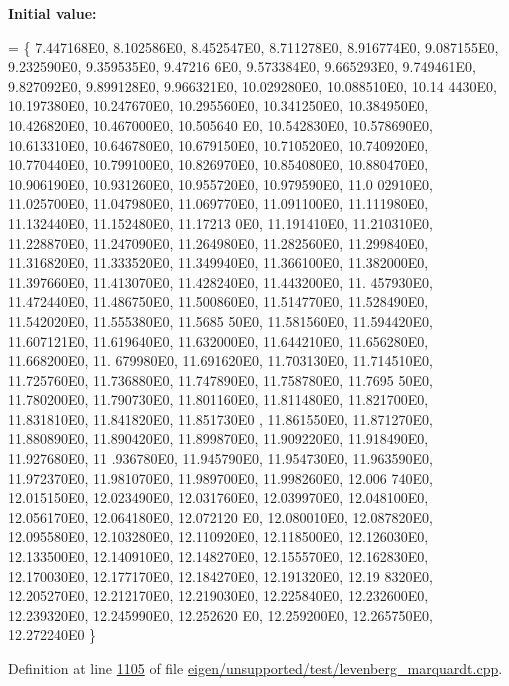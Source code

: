 {\bfseries Initial value\+:}
\begin{DoxyCode}
= \{ 7.447168E0, 8.102586E0, 8.452547E0, 8.711278E0, 8.916774E0, 9.087155E0, 9.232590E0, 9.359535E0, 9.47216
      6E0, 9.573384E0, 9.665293E0, 9.749461E0, 9.827092E0, 9.899128E0, 9.966321E0, 10.029280E0, 10.088510E0, 10.14
      4430E0, 10.197380E0, 10.247670E0, 10.295560E0, 10.341250E0, 10.384950E0, 10.426820E0, 10.467000E0, 10.505640
      E0, 10.542830E0, 10.578690E0, 10.613310E0, 10.646780E0, 10.679150E0, 10.710520E0, 10.740920E0, 10.770440E0, 
      10.799100E0, 10.826970E0, 10.854080E0, 10.880470E0, 10.906190E0, 10.931260E0, 10.955720E0, 10.979590E0, 11.0
      02910E0, 11.025700E0, 11.047980E0, 11.069770E0, 11.091100E0, 11.111980E0, 11.132440E0, 11.152480E0, 11.17213
      0E0, 11.191410E0, 11.210310E0, 11.228870E0, 11.247090E0, 11.264980E0, 11.282560E0, 11.299840E0, 11.316820E0,
       11.333520E0, 11.349940E0, 11.366100E0, 11.382000E0, 11.397660E0, 11.413070E0, 11.428240E0, 11.443200E0, 11.
      457930E0, 11.472440E0, 11.486750E0, 11.500860E0, 11.514770E0, 11.528490E0, 11.542020E0, 11.555380E0, 11.5685
      50E0,
11.581560E0, 11.594420E0, 11.607121E0, 11.619640E0, 11.632000E0, 11.644210E0, 11.656280E0, 11.668200E0, 11.
      679980E0, 11.691620E0, 11.703130E0, 11.714510E0, 11.725760E0, 11.736880E0, 11.747890E0, 11.758780E0, 11.7695
      50E0, 11.780200E0, 11.790730E0, 11.801160E0, 11.811480E0, 11.821700E0, 11.831810E0, 11.841820E0, 11.851730E0
      , 11.861550E0, 11.871270E0, 11.880890E0, 11.890420E0, 11.899870E0, 11.909220E0, 11.918490E0, 11.927680E0, 11
      .936780E0, 11.945790E0, 11.954730E0, 11.963590E0, 11.972370E0, 11.981070E0, 11.989700E0, 11.998260E0, 12.006
      740E0, 12.015150E0, 12.023490E0, 12.031760E0, 12.039970E0, 12.048100E0, 12.056170E0, 12.064180E0, 12.072120
      E0, 12.080010E0, 12.087820E0, 12.095580E0, 12.103280E0, 12.110920E0, 12.118500E0, 12.126030E0, 12.133500E0, 
      12.140910E0, 12.148270E0, 12.155570E0, 12.162830E0, 12.170030E0, 12.177170E0, 12.184270E0, 12.191320E0, 12.19
      8320E0, 12.205270E0, 12.212170E0, 12.219030E0, 12.225840E0, 12.232600E0, 12.239320E0, 12.245990E0, 12.252620
      E0, 12.259200E0, 12.265750E0, 12.272240E0 \}
\end{DoxyCode}


Definition at line \hyperlink{eigen_2unsupported_2test_2levenberg__marquardt_8cpp_source_l01105}{1105} of file \hyperlink{eigen_2unsupported_2test_2levenberg__marquardt_8cpp_source}{eigen/unsupported/test/levenberg\+\_\+marquardt.\+cpp}.

\mbox{\label{struct_bennett5__functor_ad6370e019a6ce58a23bfb2bd14e12211}} 

